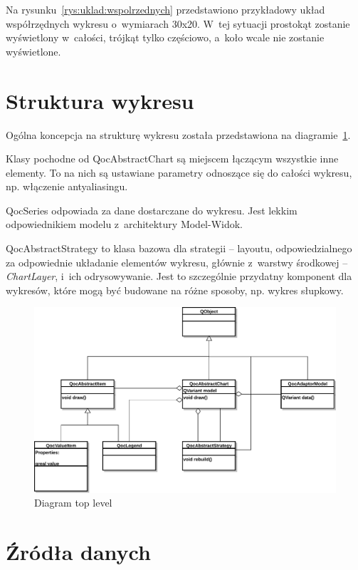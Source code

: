 Na rysunku~\ref{rys:uklad:wspolrzednych} przedstawiono przykładowy układ współrzędnych wykresu o~wymiarach 30x20. W~tej sytuacji prostokąt zostanie wyświetlony w~całości, trójkąt tylko częściowo, a~koło wcale nie zostanie wyświetlone.


\section{Struktura wykresu}
Ogólna koncepcja na strukturę wykresu została przedstawiona na diagramie~\ref{rys:klasy:top_level}.

Klasy pochodne od QocAbstractChart są miejscem łączącym wszystkie inne elementy. To na nich są ustawiane parametry odnoszące się do całości wykresu, np. włączenie antyaliasingu.

QocSeries odpowiada za dane dostarczane do wykresu. Jest lekkim odpowiednikiem modelu z~architektury Model-Widok.

QocAbstractStrategy to klasa bazowa dla strategii -- layoutu, odpowiedzialnego za odpowiednie układanie elementów wykresu, głównie z~warstwy środkowej -- \textit{ChartLayer}, i~ich odrysowywanie. Jest to szczególnie przydatny komponent dla wykresów, które mogą być budowane na różne sposoby, np. wykres słupkowy.


\begin{figure}[H]
\centering
\includegraphics[scale=0.7]{img/klasy-top_level.pdf}
\caption{Diagram top level}\label{rys:klasy:top_level}
\end{figure}

\section{Źródła danych}\label{sec:zrodla}

